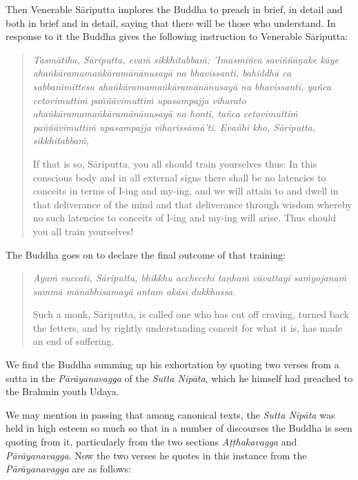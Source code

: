 Then Venerable Sāriputta implores the Buddha to preach in brief, in detail and both in brief and in detail, saying that there will be those who understand. In response to it the Buddha gives the following instruction to Venerable Sāriputta:

\begin{quote}
\emph{Tasmātiha, Sāriputta, evaṁ sikkhitabbaṁ: 'Imasmiñca saviññāṇake kāye ahaṅkāramamaṅkāramānānusayā na bhavissanti, bahiddhā ca sabbanimittesu ahaṅkāramamaṅkāramānānusayā na bhavissanti, yañca cetovimuttiṁ paññāvimuttiṁ upasampajja viharato ahaṅkāramamaṅkāramānānusayā na honti, tañca cetovimuttiṁ paññāvimuttiṁ upasampajja viharissāmā'ti. Evañhi kho, Sāriputta, sikkhitabbaṁ,}

If that is so, Sāriputta, you all should train yourselves thus: In this conscious body and in all external signs there shall be no latencies to conceits in terms of I-ing and my-ing, and we will attain to and dwell in that deliverance of the mind and that deliverance through wisdom whereby no such latencies to conceits of I-ing and my-ing will arise. Thus should you all train yourselves!
\end{quote}

The Buddha goes on to declare the final outcome of that training:

\begin{quote}
\emph{Ayaṁ vuccati, Sāriputta, bhikkhu acchecchi taṇhaṁ vāvattayi saṁyojanaṁ sammā mānābhisamayā antam akāsi dukkhassa}.

Such a monk, Sāriputta, is called one who has cut off craving, turned back the fetters, and by rightly understanding conceit for what it is, has made an end of suffering.
\end{quote}

We find the Buddha summing up his exhortation by quoting two verses from a sutta in the \emph{Pārāyanavagga} of the \emph{Sutta Nipāta}, which he himself had preached to the Brahmin youth Udaya.

We may mention in passing that among canonical texts, the \emph{Sutta Nipāta} was held in high esteem so much so that in a number of discourses the Buddha is seen quoting from it, particularly from the two sections \emph{Aṭṭhakavagga} and \emph{Pārāyanavagga}. Now the two verses he quotes in this instance from the \emph{Pārāyanavagga} are as follows:

